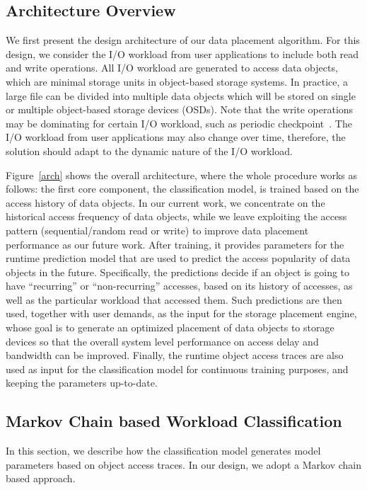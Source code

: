 \subsection{Architecture Overview}
\label{architecture}


We first present the design architecture of our data placement algorithm. For this design, we consider the I/O workload from user applications to include both read and write operations. All I/O workload are generated to access data objects, which are minimal storage units in object-based storage systems. In practice, a large file can be divided into multiple data objects which will be stored on single or multiple object-based storage devices (OSDs). Note that the write operations may be dominating for certain I/O workload, such as periodic checkpoint~\cite{naksinehaboon2008reliability}. The I/O workload from user applications may also change over time, therefore, the solution should adapt to the dynamic nature of the I/O workload.

Figure~\ref{arch} shows the overall architecture, where the whole procedure works as follows: the first core component, the classification model, is trained based on the access history of data objects. In our current work, we concentrate on the historical access frequency of data objects, while we leave exploiting the access pattern (sequential/random read or write) to improve data placement performance as our future work. After training, it provides parameters for the runtime prediction model that are used to predict the access popularity of data objects in the future. Specifically, the predictions decide if an object is going to have ``recurring'' or ``non-recurring'' accesses, based on its history of accesses, as well as the particular workload that accessed them. Such predictions are then used, together with user demands, as the input for the storage placement engine, whose goal is to generate an optimized placement of data objects to storage devices so that the overall system level performance on access delay and bandwidth can be improved. Finally, the runtime object access traces are also used as input for the classification model for continuous training purposes, and keeping the parameters up-to-date.


\subsection{Markov Chain based Workload Classification}

In this section, we describe how the classification model generates model parameters based on object access traces. In our design, we adopt a Markov chain based approach. %

